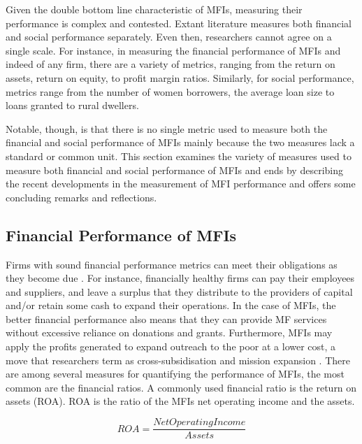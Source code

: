 \documentclass[a4paper,nobind]{templates/ociamthesis}
\begin{document}
\noindent Given the double bottom line characteristic of MFIs, measuring their performance is complex and contested. Extant literature measures both financial and social performance separately. Even then, researchers cannot agree on a single scale. For instance, in measuring the financial performance of MFIs and indeed of any firm, there are a variety of metrics, ranging from the return on assets, return on equity, to profit margin ratios. Similarly, for social performance, metrics range from the number of women borrowers, the average loan size to loans granted to rural dwellers.

Notable, though, is that there is no single metric used to measure both the financial and social performance of MFIs mainly because the two measures lack a standard or common unit. This section examines the variety of measures used to measure both financial and social performance of MFIs and ends by describing the recent developments in the measurement of MFI performance and offers some concluding remarks and reflections.

\hypertarget{financial-performance-of-mfis}{%
\subsection{Financial Performance of MFIs}\label{financial-performance-of-mfis}}

\noindent Firms with sound financial performance metrics can meet their obligations as they become due \autocite{ehrhardt2016corporate}. For instance, financially healthy firms can pay their employees and suppliers, and leave a surplus that they distribute to the providers of capital and/or retain some cash to expand their operations. In the case of MFIs, the better financial performance also means that they can provide MF services without excessive reliance on donations and grants. Furthermore, MFIs may apply the profits generated to expand outreach to the poor at a lower cost, a move that researchers term as cross-subsidisation and mission expansion \autocite{mersland2010microfinance}. There are among several measures for quantifying the performance of MFIs, the most common are the financial ratios.
A commonly used financial ratio is the return on assets (ROA). ROA is the ratio of the MFIs net operating income and the assets.

\begin{equation}
ROA = \frac{Net Operating Income}{Assets}
\end{equation}
\end{document}
